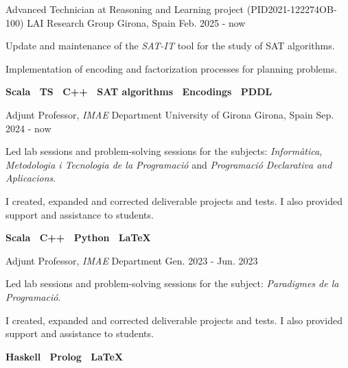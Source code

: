 

\begin{cventries}


  \cventry
  {Advanced Technician at Reasoning and Learning project (PID2021-122274OB-100)} %
  {LAI Research Group} %
  {Girona, Spain} %
  {Feb. 2025 - now} %
  {
  \begin{cvitems}
    \item {Update and maintenance of the \textit{SAT-IT} tool for the study of SAT algorithms.}
    \item {Implementation of encoding and factorization processes for planning problems.}
    \item {
      \textbf{
        Scala \textbar \
        TS \textbar \
        C++ \textbar \
        SAT algorithms \textbar \
        Encodings \textbar \
        PDDL
      }
    }
  \end{cvitems}
  }

  \cventry
    {Adjunt Professor, \textit{IMAE} Department}
    {University of Girona}
    {Girona, Spain}
    {Sep. 2024 - now}
    {
    \begin{cvitems}
    \item{Led lab sessions and problem-solving sessions for the subjects: \textit{Informàtica}, \textit{Metodologia i Tecnologia de la Programació} and \textit{Programació Declarativa and Aplicacions}.}
    \item{I created, expanded and corrected deliverable projects and tests. I also provided support and assistance to students.}
    \item {
      \textbf{
        Scala \textbar \
        C++ \textbar \
        Python \textbar \
        \LaTeX
      }
    }
    \end{cvitems}
  }
  \cventry
    {Adjunt Professor, \textit{IMAE} Department}
    {} %
    {} %
    {Gen. 2023 - Jun. 2023} %
    {
    \begin{cvitems}
    \item{Led lab sessions and problem-solving sessions for the subject: \textit{Paradigmes de la Programació}.}
    \item{I created, expanded and corrected deliverable projects and tests. I also provided support and assistance to students.}
    \item {
      \textbf{
        Haskell \textbar \
        Prolog \textbar \
        \LaTeX
      }
    }
    \end{cvitems}
    \vspace{0.25cm}
 	  }



\end{cventries}
